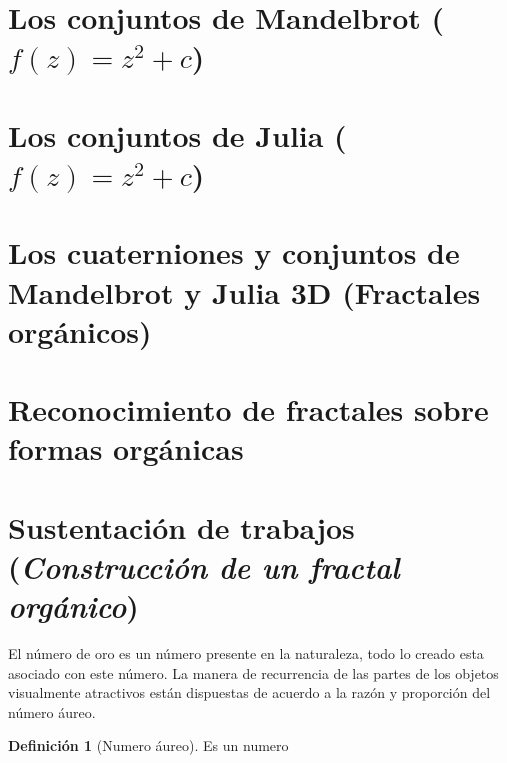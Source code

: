 \documentclass[
  11pt,
]{krantz}
\theoremstyle{definition}
\newtheorem{definition}{Definición}[chapter]
\theoremstyle{definition}
\theoremstyle{definition}
\theoremstyle{definition}
\theoremstyle{remark}
\begin{document}
\hypertarget{los-conjuntos-de-mandelbrot-fzz2c}{%
\section{\texorpdfstring{Los conjuntos de Mandelbrot (\(f(z)=z^2+c\))}{Los conjuntos de Mandelbrot (f(z)=z\^{}2+c)}}\label{los-conjuntos-de-mandelbrot-fzz2c}}

\hypertarget{los-conjuntos-de-julia-fzz2c}{%
\section{\texorpdfstring{Los conjuntos de Julia (\(f(z)=z^2+c\))}{Los conjuntos de Julia (f(z)=z\^{}2+c)}}\label{los-conjuntos-de-julia-fzz2c}}

\hypertarget{los-cuaterniones-y-conjuntos-de-mandelbrot-y-julia-3d-fractales-orguxe1nicos}{%
\section{Los cuaterniones y conjuntos de Mandelbrot y Julia 3D (Fractales orgánicos)}\label{los-cuaterniones-y-conjuntos-de-mandelbrot-y-julia-3d-fractales-orguxe1nicos}}

\hypertarget{reconocimiento-de-fractales-sobre-formas-orguxe1nicas}{%
\section{Reconocimiento de fractales sobre formas orgánicas}\label{reconocimiento-de-fractales-sobre-formas-orguxe1nicas}}

\hypertarget{sustentaciuxf3n-de-trabajos-1}{%
\section{\texorpdfstring{Sustentación de trabajos (\emph{Construcción de un fractal orgánico})}{Sustentación de trabajos ()}}\label{sustentaciuxf3n-de-trabajos-1}}

El número de oro  es un número presente en la naturaleza, todo lo creado esta asociado con este número. La manera de recurrencia de las partes de los objetos visualmente atractivos están dispuestas de acuerdo a la razón y proporción del número áureo.

\begin{definition}[Numero áureo]
\protect\hypertarget{def:aureo}{}\label{def:aureo}Es un numero
\end{definition}
\end{document}

